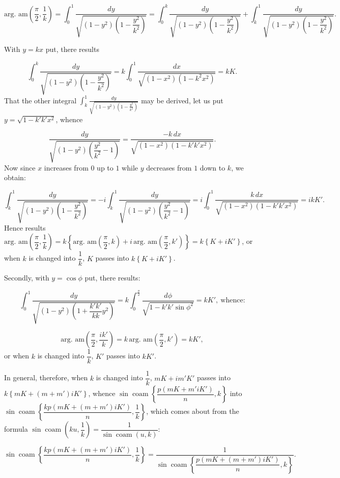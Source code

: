 \documentclass{article}
\begin{document}
\[
\text{arg.\ am}\left(\frac{\pi}{2},\frac{1}{k}\right)=\int_{0}^{1}\frac{dy}{\sqrt{(1-y^{2})\left(1-\dfrac{y^{2}}{k^{2}}\right)}}=\int_{0}^{k}\frac{dy}{\sqrt{(1-y^{2})\left(1-\dfrac{y^{2}}{k^{2}}\right)}}+\int_{k}^{1}\frac{dy}{\sqrt{(1-y^{2})\left(1-\dfrac{y^{2}}{k^{2}}\right)}}.
\]

With $y=kx$ put, there results

\[
\int_{0}^{k}\frac{dy}{\sqrt{(1-y^{2})\left(1-\dfrac{y^{2}}{k^{2}}\right)}}=k\int_{0}^{1}\frac{dx}{\sqrt{(1-x^{2})(1-k^{2}x^{2})}}=kK.
\]
That the other integral $\displaystyle\int_{k}^{1}\frac{dy}{\sqrt{(1-y^{2})\left(1-\frac{y^{2}}{k^{2}}\right)}}$ may be derived, let us put $y=\sqrt{1-k'k'x^{2}}$, whence

\[
\frac{dy}{\sqrt{(1-y^{2})\left(\dfrac{y^{2}}{k^{2}}-1\right)}}=\frac{-k\,dx}{\sqrt{(1-x^{2})(1-k'k'x^{2})}}.
\]
Now since $x$ increases from $0$ up to $1$ while $y$ decreases from $1$ down to $k$, we obtain:

\[
\int_{k}^{1}\frac{dy}{\sqrt{(1-y^{2})\left(1-\dfrac{y^{2}}{k^{2}}\right)}}=-i\int_{k}^{1}\frac{dy}{\sqrt{(1-y^{2})\left(\dfrac{y^{2}}{k^{2}}-1\right)}}=i\int_{0}^{1}\frac{k\,dx}{\sqrt{(1-x^{2})(1-k'k'x^{2})}}=ikK'.
\]
Hence results $\text{arg.\ am}\left(\dfrac{\pi}{2},\dfrac{1}{k}\right)=k\left\{\text{arg.\ am}\left(\dfrac{\pi}{2},k\right)+i\,\text{arg.\ am}\left(\dfrac{\pi}{2},k'\right)\right\}=k\left\{K+iK'\right\}$, or when $k$ is changed into $\dfrac{1}{k}$, $K$ passes into $k\left\{K+iK'\right\}$.

Secondly, with $y=\cos\phi$ put, there results:

\[
\int_{0}^{1}\frac{dy}{\sqrt{(1-y^{2})\left(1+\dfrac{k'k'}{kk}y^{2}\right)}}=k\int_{0}^{\frac{\pi}{2}}\frac{d\phi}{\sqrt{1-k'k'\sin\phi^{2}}}=kK',\ \text{whence:}
\]

\[
\text{arg.\ am}\left(\frac{\pi}{2},\frac{ik'}{k}\right)=k\,\text{arg.\ am}\left(\frac{\pi}{2},k'\right)=kK',
\]
or when $k$ is changed into $\dfrac{1}{k}$, $K'$ passes into $kK'$.

In general, therefore, when $k$ is changed into $\dfrac{1}{k}$, $mK+im'K'$ passes into $k\left\{mK+(m+m')iK'\right\}$, whence $\sin\operatorname{coam}\left\{\dfrac{p(mK+m'iK')}{n},k\right\}$ into $\sin\operatorname{coam}\left\{\dfrac{kp\left(mK+(m+m')iK'\right)}{n},\dfrac{1}{k}\right\}$, which comes about from the formula $\sin\operatorname{coam}\left(ku,\dfrac{1}{k}\right)=\dfrac{1}{\sin\operatorname{coam}(u,k)}$:

\[
\sin\operatorname{coam}\left\{\frac{kp\left(mK+(m+m')iK'\right)}{n},\frac{1}{k}\right\}=\frac{1}{\sin\operatorname{coam}\left\{\dfrac{p\left(mK+(m+m')iK'\right)}{n},k\right\}}.
\]
\end{document}
